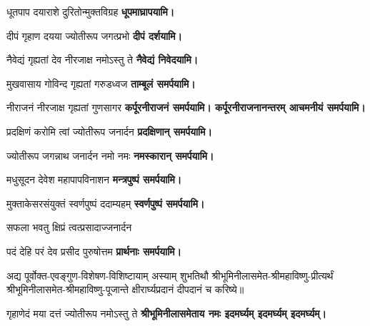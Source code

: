 \begin{center}

{धूतपाप दयाराशे दुरितोन्मुक्तविग्रह}
\textbf{\devAya{} धूपमाघ्रापयामि।}
\medskip

{दीपं गृहाण दयया ज्योतीरूप जगत्प्रभो}
\textbf{\devAya{} दीपं दर्शयामि।}
\medskip

{नैवेद्यं गृह्यतां देव नीरजाक्ष नमोऽस्तु ते}
\textbf{\devAya{} नैवेद्यं निवेदयामि।}
\medskip

{मुखवासाय गोविन्द गृह्यतां गरुडध्वज}
\textbf{\devAya{} ताम्बूलं समर्पयामि।}
\medskip

{नीराजनं नीरजाक्ष गृह्यतां गुणसागर}
\textbf{\devAya{} कर्पूरनीराजनं समर्पयामि। कर्पूरनीराजनानन्तरम् आचमनीयं समर्पयामि।}
\medskip

{प्रदक्षिणं करोमि त्वां ज्योतीरूप जनार्दन}
\textbf{\devAya{} प्रदक्षिणान् समर्पयामि।}
\medskip

{ज्योतीरूप जगन्नाथ जनार्दन नमो नमः}
\textbf{\devAya{} नमस्कारान् समर्पयामि।}
\medskip

{मधुसूदन देवेश महापापविनाशन}
\textbf{\devAya{} मन्त्रपुष्पं समर्पयामि।}
\medskip

{मुक्ताकेसरसंयुक्तं स्वर्णपुष्पं ददाम्यहम्}
\textbf{\devAya{} स्वर्णपुष्पं समर्पयामि।}
\medskip

{सफला भवतु क्षिप्रं त्वत्प्रसादाज्जनार्दन}

{पदं देहि परं देव प्रसीद पुरुषोत्तम}
\textbf{\devAya{} प्रार्थनाः समर्पयामि।}
\medskip

\end{center}


अद्य पूर्वोक्त-एवङ्गुण-विशेषण-विशिष्टायाम् अस्याम् शुभतिथौ श्रीभूमिनीलासमेत-श्रीमहाविष्णु-प्रीत्यर्थं
श्रीभूमिनीलासमेत-श्रीमहाविष्णु-पूजान्ते क्षीरार्घ्यप्रदानं दीपदानं च करिष्ये॥

{गृहाणेदं मया दत्तं ज्योतीरूप नमोऽस्तु ते}
\textbf{श्रीभूमिनीलासमेताय नमः इदमर्घ्यम् इदमर्घ्यम् इदमर्घ्यम्।}

